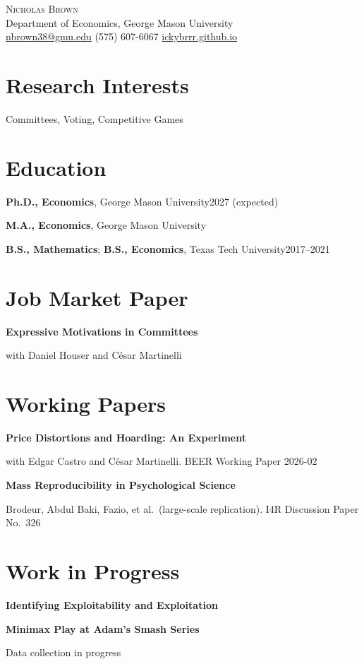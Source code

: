\documentclass[11pt]{article}
\newcommand{\entry}[2]{#1\hfill#2\par}
\newcommand{\paper}[2]{\textbf{#1}\par\hspace*{1em}#2\par\vspace{0.45em}}
\begin{document}
\begin{center}
  {\LARGE\scshape Nicholas Brown}\\[0.5em]
  Department of Economics, George Mason University\\[0.2em]
  \href{mailto:nbrown38@gmu.edu}{nbrown38@gmu.edu} \;\textbar\;
  (575) 607-6067 \;\textbar\;
  \href{https://ickybrrr.github.io}{ickybrrr.github.io}
\end{center}

\section{Research Interests}
Committees, Voting, Competitive Games

\section{Education}
\entry{\textbf{Ph.D., Economics}, George Mason University}{2027 (expected)}
\entry{\textbf{M.A., Economics}, George Mason University}{}
\vspace{0.3em}
\entry{\textbf{B.S., Mathematics}; \textbf{B.S., Economics}, Texas Tech University}{2017--2021}

\section{Job Market Paper}
\paper{Expressive Motivations in Committees}{with Daniel Houser and C\'esar Martinelli}

\section{Working Papers}
\paper{Price Distortions and Hoarding: An Experiment}{with Edgar Castro and C\'esar Martinelli. BEER Working Paper 2026-02}
\paper{Mass Reproducibility in Psychological Science}{Brodeur, Abdul Baki, Fazio, et al.\ (large-scale replication). I4R Discussion Paper No.\ 326}

\section{Work in Progress}
\paper{Identifying Exploitability and Exploitation}{}
\vspace{-1.1em}
\paper{Minimax Play at Adam's Smash Series}{Data collection in progress}
\end{document}
